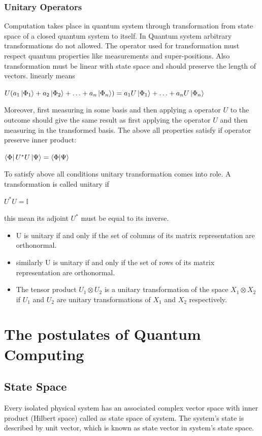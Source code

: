 \documentclass[11 pt]{article}
\theoremstyle{definition}
\theoremstyle{remark}
\newcommand{\tens}[1]{
  \mathbin{\mathop{\otimes}\limits_{#1}}}
\begin{document}
\subsubsection{Unitary Operators}
Computation takes place in quantum system through transformation from state space of a closed quantum system to itself. In Quantum system arbitrary transformations do not allowed. The operator used for transformation must respect quantum properties like measurements and super-positions. Also transformation must be linear with state space and should preserve the length of vectors. linearly means
\begin{center}
    $U(a_1\ket{\Phi_1} + a_2\ket{\Phi_2} + \hdots + a_n\ket{\Phi_n}) = a_{1}U\ket{\Phi_1} + \hdots + a_{n}U\ket{\Phi_n}$
\end{center}
 Moreover, first measuring in some basis and then applying a operator $U$ to the outcome should give the same result as first applying the operator $U$ and then measuring in the transformed basis. The above all properties satisfy if operator preserve inner product:
 \begin{center}
     $\bra{\Phi}U^{*}U\ket{\Psi} = \bra{\Phi}\ket{\Psi}$
 \end{center}
 To satisfy above all conditions unitary transformation comes into role. A transformation is called unitary if
\begin{center}
$U^{*}U=\mathbb{I}$
\end{center}
this mean its adjoint $U^{*}$ must be equal to its inverse.
\begin{itemize}
\item U is unitary if and only if the set of columns of its matrix representation are orthonormal.
\item similarly U is unitary if and only if the set of rows of its matrix representation are orthonormal.
\item  The tensor product $U_1 \tens{} U_2$ is a unitary transformation of the space $X_1 \tens{} X_2$ if $U_1$ and $U_2$ are unitary transformations of $X_1$ and $X_2$ respectively.
\end{itemize}



\section{The postulates of Quantum Computing}

\subsection{State Space}
Every isolated physical system has an associated complex vector space with inner product (Hilbert space) called as state space of system. The system's state is described by unit vector, which is known as state vector in system's state space.  
\end{document}
